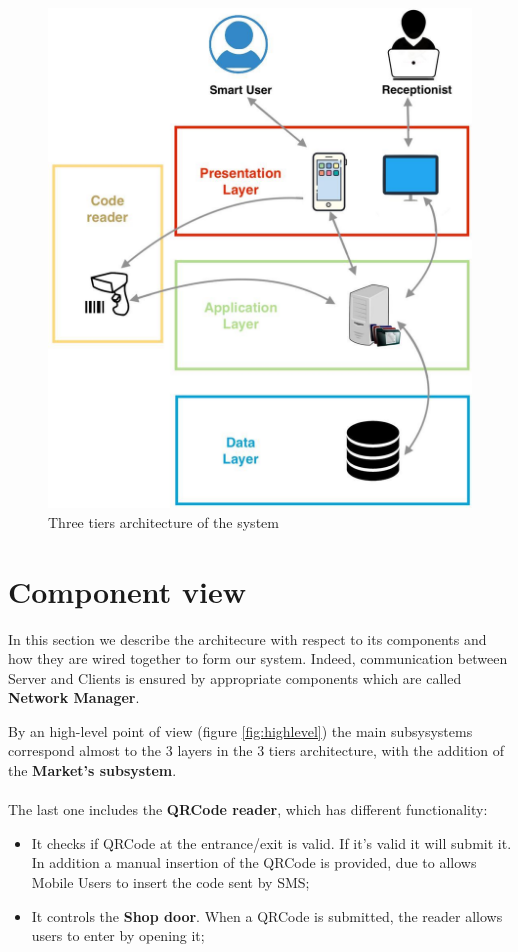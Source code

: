 \begin{figure}[H]
  \label{3tiers}
  \centering
  \includegraphics[scale=0.30]{diagrams/3_tiers.jpeg}
  \caption{Three tiers architecture of the system}
  \label{3-tier}

\end{figure}


\section{Component view}



In this section we describe the architecure with respect to its components and how they are wired together to form our system. 
Indeed, communication between Server and Clients is ensured by appropriate components which are called \textbf{Network Manager}. \par 
By an high-level point of view (figure \ref{fig:highlevel}) the main subsysystems correspond almost to the 3 layers in the 3 tiers architecture, with the addition of the \textbf{Market's subsystem}. \\ \\
The last one includes the \textbf{QRCode reader}, which has different functionality:
\begin{itemize}
\item It checks if QRCode at the entrance/exit is valid. If it's valid it will submit it. In addition a manual insertion of the QRCode is provided, due to allows Mobile Users to insert the code sent by SMS;
\item It controls the \textbf{Shop door}. When a QRCode is submitted, the reader allows users to enter by opening it;
\end{itemize}


